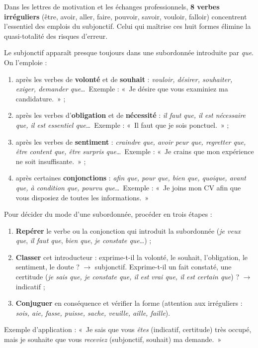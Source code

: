 \documentclass[11pt]{article}
\newcommand{\cle}[1]{{\popxbold\color{popdark}#1}}
\newcounter{popsec}
\newcounter{popsub}
\newcommand{\courssub}[1]{%
  \stepcounter{popsub}%
  \par\vspace{9pt}\noindent{\popxbold\fontsize{11.5}{13}\selectfont\color{popink}{\color{poporange}\thepopsec.\thepopsub}\hspace{6pt}#1}\par\nopagebreak\vspace{4pt}
}
\begin{document}
\begin{exemplebox}
Dans les lettres de motivation et les échanges professionnels, \textbf{8 verbes irréguliers} (être, avoir, aller, faire, pouvoir, savoir, vouloir, falloir) concentrent l'essentiel des emplois du subjonctif. Celui qui maîtrise ces huit formes élimine la quasi-totalité des risques d'erreur.
\end{exemplebox}

\courssub{Les emplois du subjonctif}

Le subjonctif apparaît presque toujours dans une \cle{subordonnée} introduite par \emph{que}. On l'emploie :

\begin{enumerate}
\item après les verbes de \textbf{volonté} et de \textbf{souhait} : \emph{vouloir, désirer, souhaiter, exiger, demander que}\ldots\ Exemple : «~Je désire que vous examiniez ma candidature.~» ;
\item après les verbes d'\textbf{obligation} et de \textbf{nécessité} : \emph{il faut que, il est nécessaire que, il est essentiel que}\ldots\ Exemple : «~Il faut que je sois ponctuel.~» ;
\item après les verbes de \textbf{sentiment} : \emph{craindre que, avoir peur que, regretter que, être content que, être surpris que}\ldots\ Exemple : «~Je crains que mon expérience ne soit insuffisante.~» ;
\item après certaines \textbf{conjonctions} : \emph{afin que, pour que, bien que, quoique, avant que, à condition que, pourvu que}\ldots\ Exemple : «~Je joins mon CV afin que vous disposiez de toutes les informations.~»
\end{enumerate}

\begin{methode}
Pour décider du mode d'une subordonnée, procéder en trois étapes :
\begin{enumerate}
\item \textbf{Repérer} le verbe ou la conjonction qui introduit la subordonnée (\emph{je veux que}, \emph{il faut que}, \emph{bien que}, \emph{je constate que}\ldots) ;
\item \textbf{Classer} cet introducteur : exprime-t-il la volonté, le souhait, l'obligation, le sentiment, le doute ? $\rightarrow$ subjonctif. Exprime-t-il un fait constaté, une certitude (\emph{je sais que, je constate que, il est vrai que, il est certain que}) ? $\rightarrow$ indicatif ;
\item \textbf{Conjuguer} en conséquence et vérifier la forme (attention aux irréguliers : \emph{sois, aie, fasse, puisse, sache, veuille, aille, faille}).
\end{enumerate}
Exemple d'application : «~Je sais que vous \emph{êtes} (indicatif, certitude) très occupé, mais je souhaite que vous \emph{receviez} (subjonctif, souhait) ma demande.~»
\end{methode}
\end{document}
